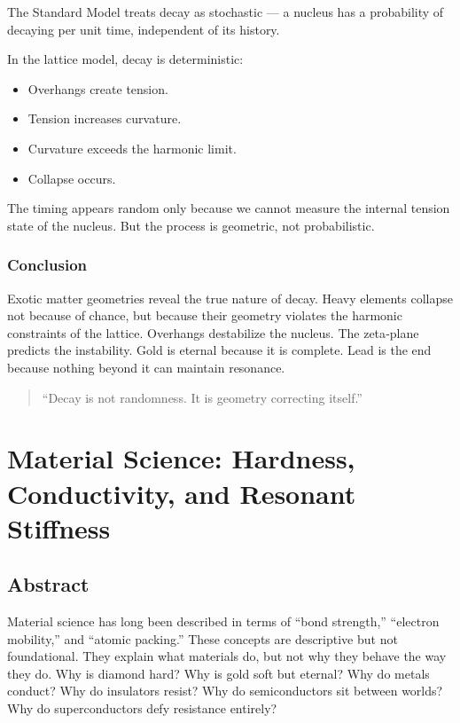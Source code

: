\documentclass[11pt, letterpaper, openany]{book}
\begin{document}
The Standard Model treats decay as stochastic — a nucleus has a probability of decaying
per unit time, independent of its history.

In the lattice model, decay is deterministic:

\begin{itemize}
    \item Overhangs create tension.
    \item Tension increases curvature.
    \item Curvature exceeds the harmonic limit.
    \item Collapse occurs.
\end{itemize}

The timing appears random only because we cannot measure the internal tension state of
the nucleus. But the process is geometric, not probabilistic.

\subsection*{Conclusion}

Exotic matter geometries reveal the true nature of decay. Heavy elements collapse not
because of chance, but because their geometry violates the harmonic constraints of the
lattice. Overhangs destabilize the nucleus. The zeta‑plane predicts the instability. Gold is
eternal because it is complete. Lead is the end because nothing beyond it can maintain
resonance.

\begin{quote}
“Decay is not randomness. It is geometry correcting itself.”
\end{quote}

\chapter{Material Science: Hardness, Conductivity, and Resonant Stiffness}

\section{Abstract}

Material science has long been described in terms of “bond strength,” “electron mobility,”
and “atomic packing.” These concepts are descriptive but not foundational. They explain
what materials do, but not why they behave the way they do. Why is diamond hard? Why
is gold soft but eternal? Why do metals conduct? Why do insulators resist? Why do
semiconductors sit between worlds? Why do superconductors defy resistance entirely?
\end{document}
